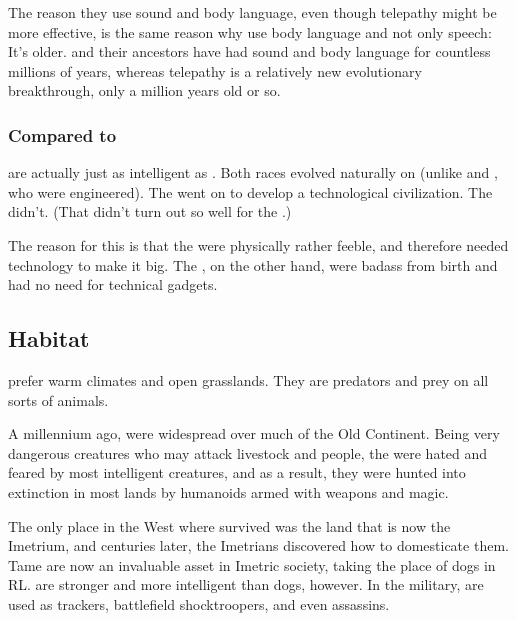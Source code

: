 The reason they use sound and body language, even though telepathy might be more effective, is the same reason why \humans{} use body language and not only speech: 
It's older. 
\Nycans{} and their ancestors have had sound and body language for countless millions of years, whereas telepathy is a relatively new evolutionary breakthrough, only a million years old or so. 





\subsubsection{Compared to \nephilim}
\Nycans{} are actually just as intelligent as \nephilim. 
Both races evolved naturally on \Miith{} (unlike \scathae{} and \humans, who were engineered). 
The \nephilim{} went on to develop a technological civilization. 
The \nycans{} didn't. 
(That didn't turn out so well for the \nephilim.)

The reason for this is that the \nephilim{} were physically rather feeble, and therefore needed technology to make it big. 
The \nycans, on the other hand, were badass from birth and had no need for technical gadgets. 









\subsection{Habitat}
\Nycans{} prefer warm climates and open grasslands. They are predators and prey on all sorts of animals. 

A millennium ago, \nycans{} were widespread over much of the Old Continent. Being very dangerous creatures who may attack livestock and people, the \nycans{} were hated and feared by most intelligent creatures, and as a result, they were hunted into extinction in most lands by humanoids armed with weapons and magic. 

The only place in the West where \nycans{} survived was the land that is now the Imetrium, and centuries later, the Imetrians discovered how to domesticate them. Tame \nycans{} are now an invaluable asset in Imetric society, taking the place of dogs in RL. \Nycans{} are stronger and more intelligent than dogs, however. In the military, \nycans{} are used as trackers, battlefield shocktroopers, and even assassins. 









